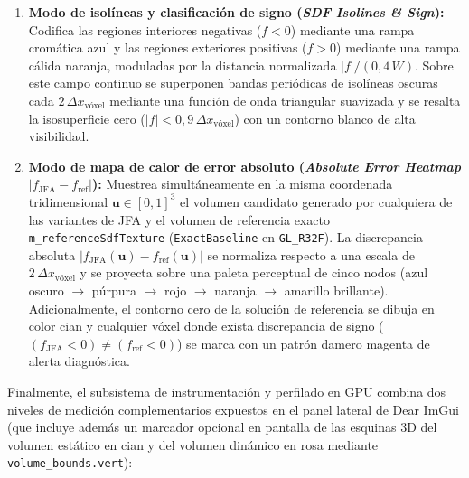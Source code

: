 \begin{enumerate}
  \item \textbf{Modo de isolíneas y clasificación de signo (\textit{SDF Isolines \& Sign}):} Codifica las regiones interiores negativas ($f < 0$) mediante una rampa cromática azul y las regiones exteriores positivas ($f > 0$) mediante una rampa cálida naranja, moduladas por la distancia normalizada $|f| / (0,4\,W)$. Sobre este campo continuo se superponen bandas periódicas de isolíneas oscuras cada $2\,\Delta x_{\text{vóxel}}$ mediante una función de onda triangular suavizada y se resalta la isosuperficie cero ($|f| < 0,9\,\Delta x_{\text{vóxel}}$) con un contorno blanco de alta visibilidad.
  \item \textbf{Modo de mapa de calor de error absoluto (\textit{Absolute Error Heatmap} $|f_{\text{JFA}} - f_{\text{ref}}|$):} Muestrea simultáneamente en la misma coordenada tridimensional $\mathbf{u} \in [0, 1]^3$ el volumen candidato generado por cualquiera de las variantes de JFA y el volumen de referencia exacto \texttt{m\_referenceSdfTexture} (\texttt{ExactBaseline} en \texttt{GL\_R32F}). La discrepancia absoluta $|f_{\text{JFA}}(\mathbf{u}) - f_{\text{ref}}(\mathbf{u})|$ se normaliza respecto a una escala de $2\,\Delta x_{\text{vóxel}}$ y se proyecta sobre una paleta perceptual de cinco nodos (azul oscuro $\to$ púrpura $\to$ rojo $\to$ naranja $\to$ amarillo brillante). Adicionalmente, el contorno cero de la solución de referencia se dibuja en color cian y cualquier vóxel donde exista discrepancia de signo ($(f_{\text{JFA}} < 0) \neq (f_{\text{ref}} < 0)$) se marca con un patrón damero magenta de alerta diagnóstica.
\end{enumerate}

Finalmente, el subsistema de instrumentación y perfilado en GPU combina dos niveles de medición complementarios expuestos en el panel lateral de Dear ImGui (que incluye además un marcador opcional en pantalla de las esquinas 3D del volumen estático en cian y del volumen dinámico en rosa mediante \texttt{volume\_bounds.vert}):

